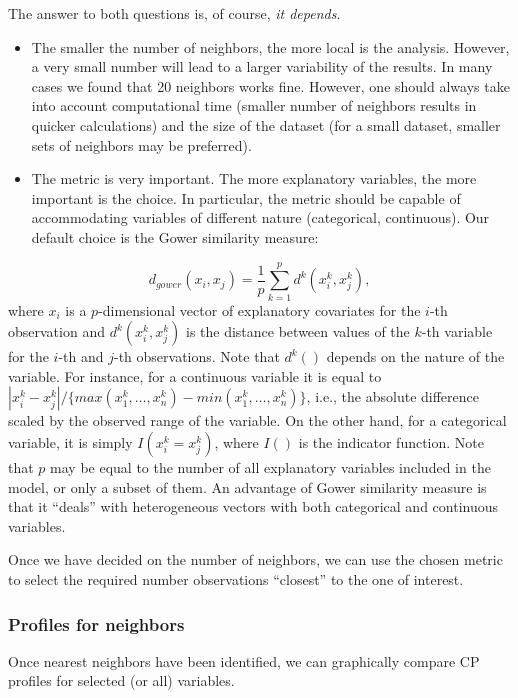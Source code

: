 \documentclass[12pt,]{krantz}
\providecommand{\tightlist}{%
  \setlength{\itemsep}{0pt}\setlength{\parskip}{0pt}}
\begin{document}
The answer to both questions is, of course, \emph{it depends}.

\begin{itemize}
\tightlist
\item
  The smaller the number of neighbors, the more local is the analysis. However, a very small number will lead to a larger variability of the results. In many cases we found that 20 neighbors works fine. However, one should always take into account computational time (smaller number of neighbors results in quicker calculations) and the size of the dataset (for a small dataset, smaller sets of neighbors may be preferred).
\item
  The metric is very important. The more explanatory variables, the more important is the choice. In particular, the metric should be capable of accommodating variables of different nature (categorical, continuous). Our default choice is the Gower similarity measure:
\end{itemize}

\[
d_{gower}(x_i, x_j) = \frac 1p \sum_{k=1}^p d^k(x_i^k, x_j^k),
\]
where \(x_i\) is a \(p\)-dimensional vector of explanatory covariates for the \(i\)-th observation and \(d^k(x_i^k,x_j^k)\) is the distance between values of the \(k\)-th variable for the \(i\)-th and \(j\)-th observations. Note that \(d^k()\) depends on the nature of the variable. For instance, for a continuous variable it is equal to \(|x_i^k-x_j^k|/\{max(x_1^k,\ldots,x_n^k)-min(x_1^k,\ldots,x_n^k)\}\), i.e., the absolute difference scaled by the observed range of the variable. On the other hand, for a categorical variable, it is simply \(I(x_i^k = x_j^k)\), where \(I()\) is the indicator function. Note that \(p\) may be equal to the number of all explanatory variables included in the model, or only a subset of them. An advantage of Gower similarity measure is that it ``deals'' with heterogeneous vectors with both categorical and continuous variables.

Once we have decided on the number of neighbors, we can use the chosen metric to select the required number observations ``closest'' to the one of interest.

\hypertarget{cPLocDiagProfiles}{%
\subsubsection{Profiles for neighbors}\label{cPLocDiagProfiles}}

Once nearest neighbors have been identified, we can graphically compare CP profiles for selected (or all) variables.
\end{document}
